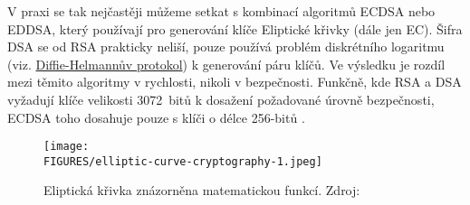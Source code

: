 V praxi se tak nejčastěji můžeme setkat s kombinací algoritmů ECDSA nebo \mbox{EDDSA}, který používají pro generování klíče Eliptické křivky (dále jen EC). Šifra DSA se od RSA prakticky neliší, pouze používá problém diskrétního logaritmu (viz. \hyperref[sec:diffie-hellman]{Diffie-Helmannův protokol}) k generování páru klíčů. Ve výsledku je rozdíl mezi těmito algoritmy v rychlosti, nikoli v bezpečnosti. Funkčně, kde RSA a DSA vyžadují klíče velikosti 3072~bitů k dosažení požadované úrovně bezpečnosti, \mbox{ECDSA} toho dosahuje pouze s klíči o délce 256-bitů \mbox{\parencite{kontsevoy2020}.}

\begin{figure}[htbp]
    \centering
    \texttt{[image: \\FIGURES/elliptic-curve-cryptography-1.jpeg]}
    \caption{Eliptická křivka znázorněna matematickou funkcí. Zdroj: \parencite{eliptic-curve-1}}
    \label{fig:elliptic-curve-cryptography}
  \end{figure}
\newpage